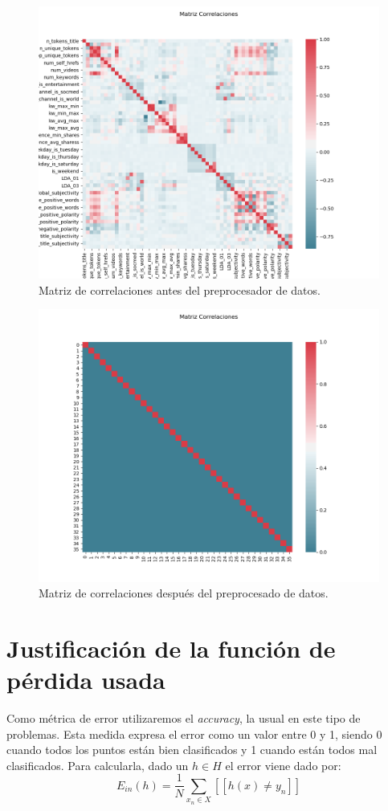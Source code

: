 \documentclass[size=a4, parskip=half, titlepage=false, toc=flat, toc=bib, 12pt]{scrartcl}
\begin{document}
\begin{figure}[H]
\centering
\includegraphics[width=1\textwidth]{./img/antespre}
\caption{Matriz de correlaciones antes del preprocesador de datos.}
\end{figure}
\begin{figure}[H]
\centering
\includegraphics[width=1\textwidth]{./img/despuespre}
\caption{Matriz de correlaciones después del preprocesado de datos.}
\end{figure}

\section{Justificación de la función de pérdida usada}
Como métrica de error utilizaremos el \textit{accuracy}, la usual en este tipo de problemas. Esta medida expresa el error como un valor entre 0 y 1, siendo 0 cuando todos los puntos están bien clasificados y 1 cuando están todos mal clasificados. Para calcularla, dado un $h \in H$ el error viene dado por:
$$E_{in}(h) = \frac{1}{N} \sum_{x_n \in X} [[ h(x) \neq y_n]] $$
\end{document}
